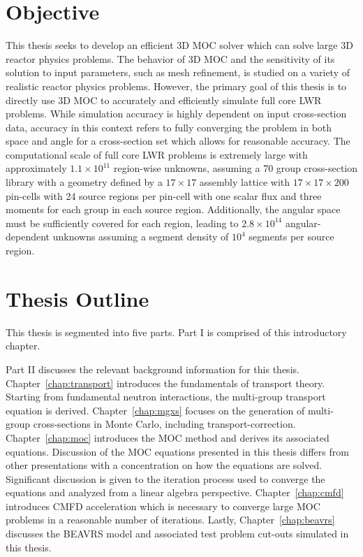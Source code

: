 \section{Objective}

This thesis seeks to develop an efficient 3D \ac{MOC} solver which can solve large 3D reactor physics problems. The behavior of 3D \ac{MOC} and the sensitivity of its solution to input parameters, such as mesh refinement, is studied on a variety of realistic reactor physics problems. However, the primary goal of this thesis is to directly use 3D \ac{MOC} to accurately and efficiently simulate full core LWR problems. While simulation accuracy is highly dependent on input cross-section data, accuracy in this context refers to fully converging the problem in both space and angle for a cross-section set which allows for reasonable accuracy. The computational scale of full core LWR problems is extremely large with approximately $1.1 \times 10^{11}$ region-wise unknowns, assuming a 70 group cross-section library with a geometry defined by a $17 \times 17$ assembly lattice with $17 \times 17 \times 200$ pin-cells with 24 source regions per pin-cell with one scalar flux and three moments for each group in each source region. Additionally, the angular space must be sufficiently covered for each region, leading to $2.8 \times 10^{14}$ angular-dependent unknowns assuming a segment density of $10^4$ segments per source region.

\section{Thesis Outline}

This thesis is segmented into five parts. Part I is comprised of this introductory chapter.

Part II discusses the relevant background information for this thesis. Chapter~\ref{chap:transport} introduces the fundamentals of transport theory. Starting from fundamental neutron interactions, the multi-group transport equation is derived. Chapter~\ref{chap:mgxs} focuses on the generation of multi-group cross-sections in Monte Carlo, including transport-correction. Chapter~\ref{chap:moc} introduces the \ac{MOC} method and derives its associated equations. Discussion of the \ac{MOC} equations presented in this thesis differs from other presentations with a concentration on how the equations are solved. Significant discussion is given to the iteration process used to converge the equations and analyzed from a linear algebra perspective. Chapter~\ref{chap:cmfd} introduces \ac{CMFD} acceleration which is necessary to converge large \ac{MOC} problems in a reasonable number of iterations. Lastly, Chapter~\ref{chap:beavrs} discusses the BEAVRS model and associated test problem cut-outs simulated in this thesis.

